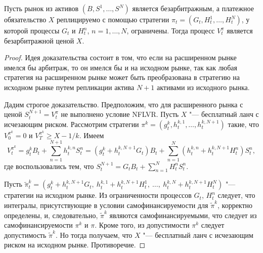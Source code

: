 \begin{proposition}
\label{gen:p:replication}
Пусть рынок из активов $(B,S^1,\dots,S^N)$ является безарбитражным, а платежное обязательство $X$ реплицируемо с помощью стратегии $\pi_t = (G_t,H_t^1,\dots,H_t^N)$, у которой процессы $G_t$ и $H_t^n$, $n=1,\dots,N$, ограничены.
Тогда процесс $V_t^\pi$ является безарбитражной ценой $X$.
\end{proposition}
\begin{proof}
Идея доказательства состоит в том, что если на расширенном рынке имелся бы арбитраж, то он имелся бы и на исходном рынке, так как любая стратегия на расширенном рынке может быть преобразована в стратегию на исходном рынке путем репликации актива $N+1$ активами из исходного рынка. 

Дадим строгое доказательство.
Предположим, что для расширенного рынка с ценой $S_t^{N+1} = V_t^\pi$ не выполнено условие NFLVR.
Пусть $X$ "--- бесплатный ланч с исчезающим риском.
Рассмотрим стратегии $\pi^k = (g_t^k,h_t^{k,1},\dots,h_t^{k,N+1})$ такие, что $V_0^{\pi^k} = 0$ и $V_T^{\pi^k} \ge X-1/k$.
Имеем
\[
V_t^{\pi^k} = g_t^k B_t + \sum_{n=1}^{N+1} h_t^{k,n} S_t^n
= (g_t^k + h_t^{k,N+1}G_t)B_t + \sum_{n=1}^{N} (h_t^{k,n} + h_t^{k,N+1}H_t^n)S_t^n,
\]
где воспользовались тем, что $S_t^{N+1} = G_tB_t + \sum_{n=1}^N H_t^nS_t^n$.

Пусть $\tilde \pi^k_t = (g_t^k + h_t^{k,N+1}G_t,\ h_t^{k,1} + h_t^{k,N+1}H_t^1,\ \dots,\ h_t^{k,N} + h_t^{k,N+1}H_t^N)$ "--- стратегии на исходном рынке.
Из ограниченности процессов $G_t$, $H_t^n$ следует, что интегралы, присутствующие в условии самофинансируемости для $\tilde \pi^k$, корректно определены, и, следовательно, $\tilde\pi^k$ являются самофинансируемыми, что следует из самофинансируемости $\pi^k$ и $\pi$.
Кроме того, из допустимости $\pi^k$ следует допустимость $\tilde \pi^k$.
Но тогда получаем, что $X$ "--- бесплатный ланч с исчезающим риском на исходном рынке. 
Противоречие.
\end{proof}

